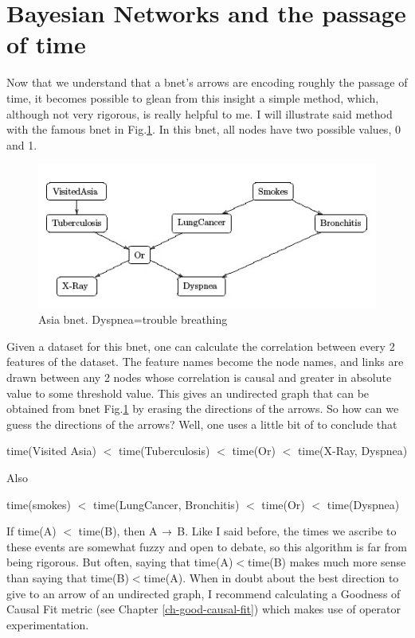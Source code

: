 \section{Bayesian Networks and the passage of time}

Now that we understand that a bnet’s arrows are encoding roughly the passage
of time, it becomes possible to glean from this insight a simple method,
which, although not very rigorous, is really helpful to me. I will illustrate
said method with the famous  bnet in Fig.\ref{fig-asia}.
 In this bnet, all nodes
have two  possible values, 0 and 1.

\begin{figure}[h!]
\centering
\includegraphics[width=5in]
{bnets-time/asia.jpg}
\caption{Asia bnet. Dyspnea=trouble breathing}
\label{fig-asia}
\end{figure}


Given a dataset for this bnet, one can calculate the correlation between
every 2 features of the dataset. The feature names become the node names, and
links are drawn between any 2 nodes whose correlation is 
causal and greater in absolute
value to some threshold value.
This gives an undirected graph that can be
obtained from bnet Fig.\ref{fig-asia}
 by erasing the directions of the arrows. So how
can we guess the directions of the arrows? Well, one uses a little bit of
 to conclude that

time(Visited Asia) $<$ time(Tuberculosis) $<$ time(Or) $<$ time(X-Ray,
Dyspnea)

Also

time(smokes) $<$ time(LungCancer, Bronchitis) $<$ time(Or) $<$ time(Dyspnea)

If time(A) $<$ time(B), then A $\rightarrow$ B. Like I
said before, the times we ascribe to
these events are somewhat fuzzy and open to debate, so this algorithm is far
from being rigorous. But often, saying that  time(A)$<$time(B) makes much more
sense than saying that time(B)$<$time(A). When in doubt about the best
direction to give to an arrow of an undirected graph, I recommend calculating
a Goodness of Causal Fit metric (see Chapter
\ref{ch-good-causal-fit}) which makes use of  operator
experimentation.



